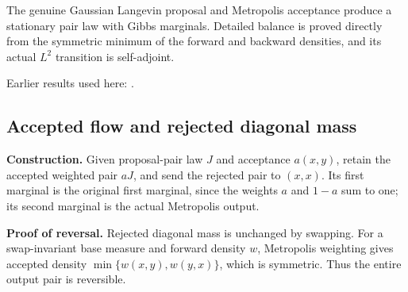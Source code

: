\documentclass[11pt,a4paper]{report}
\begin{document}
The genuine Gaussian Langevin proposal and Metropolis acceptance produce a stationary pair law with Gibbs marginals. Detailed balance is proved directly from the symmetric minimum of the forward and backward densities, and its actual \(L^2\) transition is self-adjoint.



Earlier results used here: \cite[Section~3.39]{LangevinLean2026ULASC}.
\subsection{\texorpdfstring{Accepted flow and rejected diagonal mass}{Accepted flow and rejected diagonal mass}}
\label{report-step-WassersteinMixing-SemigroupMALA-lean-1}


\textbf{Construction.} Given proposal-pair law \(J\) and acceptance \(a(x,y)\), retain the accepted weighted pair \(aJ\), and send the rejected pair to \((x,x)\). Its first marginal is the original first marginal, since the weights \(a\) and \(1-a\) sum to one; its second marginal is the actual Metropolis output.



\textbf{Proof of reversal.} Rejected diagonal mass is unchanged by swapping. For a swap-invariant base measure and forward density \(w\), Metropolis weighting gives accepted density \(\min\{w(x,y),w(y,x)\}\), which is symmetric. Thus the entire output pair is reversible.
\end{document}
